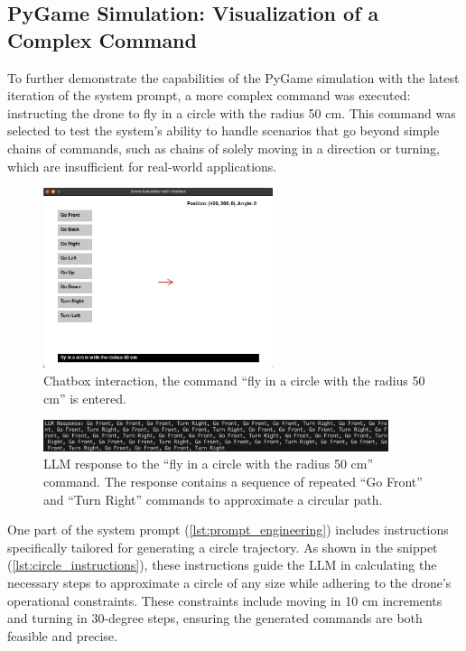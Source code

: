\subsection{PyGame Simulation: Visualization of a Complex Command}
To further demonstrate the capabilities of the PyGame simulation with the latest iteration of the system prompt, a more complex command was executed: instructing the drone to fly in a circle with the radius 50 cm. 
This command was selected to test the system's ability to handle scenarios that go beyond simple chains of commands, such as chains of solely moving in a direction or turning, 
which are insufficient for real-world applications.

\begin{figure}[H]
    \centering
    \includegraphics[width=0.6\textwidth]{img/sim_command_circle.jpeg}
    \caption{Chatbox interaction, the command ``fly in a circle with the radius 50 cm'' is entered.}
    \label{fig:sim_command_circle}
\end{figure}

\begin{figure}[H]
    \centering
    \includegraphics[width=0.9\textwidth]{img/response_circle.jpeg}
    \caption{\ac{LLM} response to the ``fly in a circle with the radius 50 cm'' command. The response contains a sequence of repeated ``Go Front'' and ``Turn Right'' commands to approximate a circular path.}
    \label{fig:response_circle}
\end{figure}

One part of the system prompt (\ref{lst:prompt_engineering}) includes instructions specifically tailored for generating a circle trajectory. As shown in the snippet (\ref{lst:circle_instructions}), 
these instructions guide the \ac{LLM} in calculating the necessary steps to approximate a circle of any size while adhering to the drone's operational constraints. 
These constraints include moving in 10 cm increments and turning in 30-degree steps, ensuring the generated commands are both feasible and precise.


